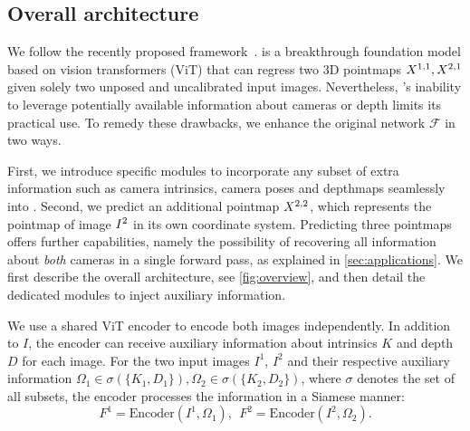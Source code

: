 \subsection{Overall architecture}

We follow the recently proposed \duster{} framework~\cite{wang2024dust3r}.
\duster{} is a breakthrough foundation model based on vision transformers (ViT) that can regress two 3D pointmaps $X^{1,1}, X^{2,1}$ given solely two unposed and uncalibrated input images.
Nevertheless, \duster{}'s inability to leverage potentially available information about cameras or depth %
limits its practical use.
To remedy these drawbacks, we enhance the original \duster{} network $\mathcal{F}$ in two ways.

First, we introduce specific modules to incorporate any subset of extra information such as  camera intrinsics, camera poses and depthmaps seamlessly into \duster{}.
Second, we predict an additional pointmap $X^{2,2}$, which represents the pointmap of image $I^{2}$ in its own coordinate system.
Predicting three pointmaps offers further capabilities, namely the possibility of recovering all information about \emph{both} cameras in a single forward pass, as explained in \cref{sec:applications}.
We first describe the overall architecture, see \cref{fig:overview}, and then detail the dedicated modules to inject auxiliary information.


We use a shared ViT encoder to encode both images independently. 
In addition to $I$, the encoder can receive auxiliary information about intrinsics $K$ and depth $D$ for each image.
For the two input images $I^1$, $I^2$ and their respective auxiliary information $\Omega_1 \in \sigma(\{K_1,D_1\}), \Omega_2 \in \sigma(\{K_2,D_2\})$, where $\sigma$ denotes the set of all subsets, the encoder processes the information in a Siamese manner:
\begin{equation}
  F^1 = \text{Encoder}(I^1,\Omega_1), ~~ F^2 = \text{Encoder}(I^2,\Omega_2).
\end{equation}


